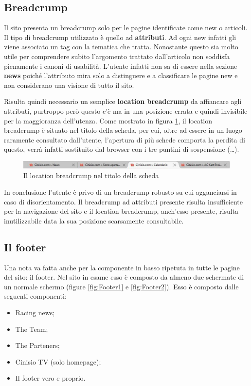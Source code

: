	
	\newpage
	\subsection{Breadcrump}
		Il sito presenta un breadcrump solo per le pagine identificate come new o articoli. Il tipo di breadcrump utilizzato è quello ad \textbf{attributi}. Ad ogni new infatti gli viene associato un tag con la tematica che tratta.
		Nonostante questo sia molto utile per comprendere subito l'argomento trattato dall'articolo non soddisfa pienamente i canoni di usabilità. L'utente infatti non sa di essere nella sezione \textbf{news} poiché l'attributo mira solo a distinguere e a classificare le pagine new e non considerano una visione  di tutto il sito.
		
	Risulta quindi necessario un semplice \textbf{location breadcrump} da affiancare agli attributi, purtroppo però questo c'è ma in una posizione errata e quindi invisibile per la maggioranza dell'utenza. Come mostrato in figura \ref{fig:LocationBreadcrump}, il location breadcrump è situato nel titolo della scheda, per cui, oltre ad essere in un luogo raramente consultato dall'utente, l'apertura di più schede comporta la perdita di questo, verrà infatti sostituito dal browser con i tre puntini di sospensione (\dots).
		
		\begin{figure} [h]
			\includegraphics[width=\textwidth]{images/Dettaglio_PathInTheTitleCard}
			\caption{Il location breadcrump nel titolo della scheda}
			\label{fig:LocationBreadcrump}
		\end{figure}
		
		 In conclusione l'utente è privo di un breadcrump robusto su cui agganciarsi in caso di disorientamento. Il breadcrump ad attributi presente risulta insufficiente per la navigazione del sito e il location breadcrump, anch'esso presente, risulta inutilizzabile data la sua posizione scarsamente consultabile.
		 
	\newpage
	\subsection{Il footer}
		Una nota va fatta anche per la componente in basso ripetuta in tutte le pagine del sito: il footer. Nel sito in esame esso è composto da almeno due schermate di un normale schermo (figure \ref{fig:Footer1} e \ref{fig:Footer2}). Esso è composto dalle seguenti componenti:
		\begin{itemize}
			\item Racing news;
			\item The Team;
			\item The Parteners;
			\item Cinisio TV (solo homepage);
			\item Il footer vero e proprio.
		\end{itemize}
		
